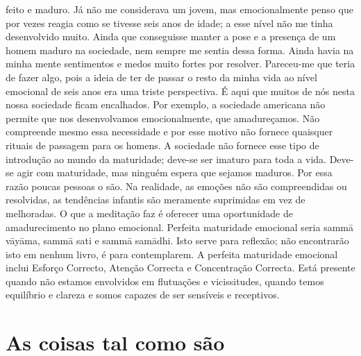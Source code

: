 feito e maduro. Já não me considerava um jovem, mas
emocionalmente penso que por vezes reagia como se tivesse
seis anos de idade; a esse nível não me tinha desenvolvido
muito. Ainda que conseguisse manter a pose e a presença de
um homem maduro na sociedade, nem sempre me sentia
dessa forma. Ainda havia na minha mente sentimentos e
medos muito fortes por resolver. Pareceu-me que teria de
fazer algo, pois a ideia de ter de passar o resto da minha vida
ao nível emocional de seis anos era uma triste perspectiva.
É aqui que muitos de nós nesta nossa sociedade ficam
encalhados. Por exemplo, a sociedade americana não permite
que nos desenvolvamos emocionalmente, que amadureçamos.
Não compreende mesmo essa necessidade e por esse motivo
não fornece quaisquer rituais de passagem para os homens. A
sociedade não fornece esse tipo de introdução ao mundo da
maturidade; deve-se ser imaturo para toda a vida. Deve-se
agir com maturidade, mas ninguém espera que sejamos
maduros.
Por essa razão poucas pessoas o são. Na realidade, as
emoções não são compreendidas ou resolvidas, as tendências
infantis são meramente suprimidas em vez de melhoradas.
O que a meditação faz é oferecer uma oportunidade de
amadurecimento no plano emocional. Perfeita maturidade
emocional seria sammā vāyāma, sammā sati e sammā samādhi.
Isto serve para reflexão; não encontrarão isto em nenhum
livro, é para contemplarem. A perfeita maturidade emocional
inclui Esforço Correcto, Atenção Correcta e Concentração
Correcta. Está presente quando não estamos envolvidos em
flutuações e vicissitudes, quando temos equilíbrio e clareza e
somos capazes de ser sensíveis e receptivos.

\section{As coisas tal como são}

